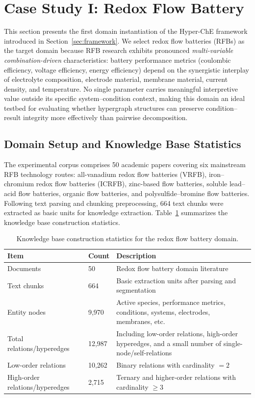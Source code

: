 \section{Case Study I: Redox Flow Battery}
\label{sec:case_flow_battery}

This section presents the first domain instantiation of the Hyper-ChE framework introduced in Section~\ref{sec:framework}. We select redox flow batteries (RFBs) as the target domain because RFB research exhibits pronounced \emph{multi-variable combination-driven} characteristics: battery performance metrics (coulombic efficiency, voltage efficiency, energy efficiency) depend on the synergistic interplay of electrolyte composition, electrode material, membrane material, current density, and temperature. No single parameter carries meaningful interpretive value outside its specific system--condition context, making this domain an ideal testbed for evaluating whether hypergraph structures can preserve condition--result integrity more effectively than pairwise decomposition.

\subsection{Domain Setup and Knowledge Base Statistics}
\label{subsec:flow_battery_setup}

The experimental corpus comprises 50 academic papers covering six mainstream RFB technology routes: all-vanadium redox flow batteries (VRFB), iron--chromium redox flow batteries (ICRFB), zinc-based flow batteries, soluble lead--acid flow batteries, organic flow batteries, and polysulfide--bromine flow batteries. Following text parsing and chunking preprocessing, 664 text chunks were extracted as basic units for knowledge extraction. Table~\ref{tab:flow_battery_kb} summarizes the knowledge base construction statistics.

\begin{table}[htbp]
\centering
\caption{Knowledge base construction statistics for the redox flow battery domain.}
\label{tab:flow_battery_kb}
\begin{tabular}{@{}llp{6.5cm}@{}}
\toprule
\textbf{Item} & \textbf{Count} & \textbf{Description} \\
\midrule
Documents & 50 & Redox flow battery domain literature \\
Text chunks & 664 & Basic extraction units after parsing and segmentation \\
Entity nodes & 9,970 & Active species, performance metrics, conditions, systems, electrodes, membranes, etc. \\
Total relations/hyperedges & 12,987 & Including low-order relations, high-order hyperedges, and a small number of single-node/self-relations \\
Low-order relations & 10,262 & Binary relations with cardinality $=2$ \\
High-order relations/hyperedges & 2,715 & Ternary and higher-order relations with cardinality $\geq 3$ \\
\bottomrule
\end{tabular}
\end{table}

